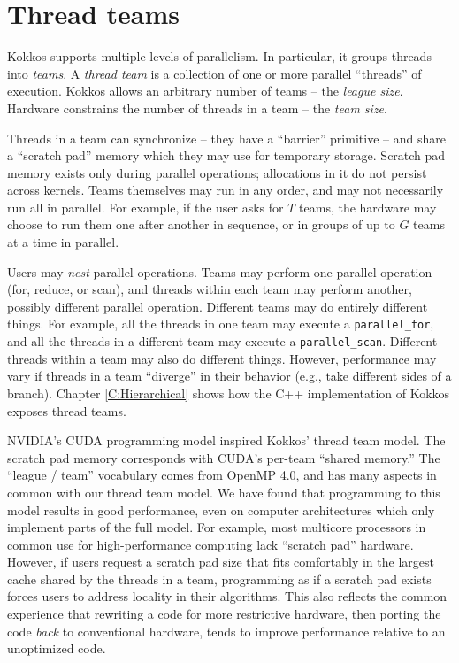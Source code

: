 \section{Thread teams}\label{S:Model:Teams}

Kokkos supports multiple levels of parallelism.
In particular, it groups threads into \emph{teams}.
A \emph{thread team} is a collection of one or more parallel ``threads'' of execution.
Kokkos allows an arbitrary number of teams -- the \emph{league size}.
Hardware constrains the number of threads in a team -- the \emph{team size}.

Threads in a team can synchronize -- they have a ``barrier'' primitive -- 
and share a ``scratch pad'' memory which they may use for temporary storage.
Scratch pad memory exists only during parallel operations;
allocations in it do not persist across kernels.
Teams themselves may run in any order,
and may not necessarily run all in parallel.
For example, if the user asks for $T$ teams,
the hardware may choose to run them one after another in sequence,
or in groups of up to $G$ teams at a time in parallel.

Users may \emph{nest} parallel operations.
Teams may perform one parallel operation (for, reduce, or scan),
and threads within each team may perform another, possibly different parallel operation.
Different teams may do entirely different things.
For example, all the threads in one team may execute a \lstinline!parallel_for!,
and all the threads in a different team may execute a \lstinline!parallel_scan!.
Different threads within a team may also do different things.
However, performance may vary if threads in a team ``diverge'' in their behavior
(e.g., take different sides of a branch).
Chapter \ref{C:Hierarchical} shows how the C++ implementation of Kokkos exposes thread teams.

NVIDIA's CUDA programming model inspired Kokkos' thread team model.
The scratch pad memory corresponds with CUDA's per-team ``shared memory.''
The ``league / team'' vocabulary comes from OpenMP 4.0,
and has many aspects in common with our thread team model.
We have found that programming to this model results in good performance,
even on computer architectures which only implement parts of the full model.
For example, most multicore processors in common use for high-performance computing lack ``scratch pad'' hardware.
However, if users request a scratch pad size that fits comfortably in the largest cache shared by the threads in a team,
programming as if a scratch pad exists forces users to address locality in their algorithms.
This also reflects the common experience that rewriting a code for more restrictive hardware,
then porting the code \emph{back} to conventional hardware,
tends to improve performance relative to an unoptimized code.

